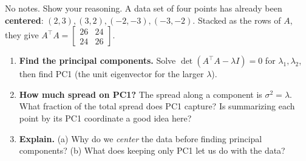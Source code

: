 \documentclass[10pt]{article}
\newcommand{\T}{^{\top}}
\begin{document}
\namedateperiod

\vspace{0.15in}

No notes. Show your reasoning. A data set of four points has already been \textbf{centered}:
$(2,3),(3,2),(-2,-3),(-3,-2)$. Stacked as the rows of $A$, they give
$A\T A=\begin{bmatrix} 26 & 24\\ 24 & 26 \end{bmatrix}$.

\begin{enumerate}[leftmargin=1.8em, itemsep=15pt]
  \item \textbf{Find the principal components.} Solve $\det(A\T A-\lambda I)=0$ for $\lambda_1,\lambda_2$, then find PC1 (the unit eigenvector for the larger $\lambda$).
        \vspace{1.9cm}
  \item \textbf{How much spread on PC1?} The spread along a component is $\sigma^2=\lambda$. What fraction of the total spread does PC1 capture? Is summarizing each point by its PC1 coordinate a good idea here?
        \vspace{1.9cm}
  \item \textbf{Explain.} (a) Why do we \emph{center} the data before finding principal components? (b) What does keeping only PC1 let us do with the data? 
\end{enumerate}
\end{document}
